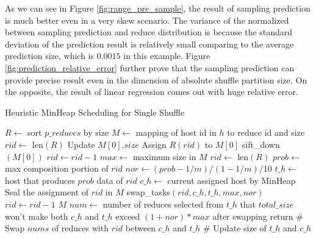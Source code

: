 As we can see in Figure \ref{fig:range_pre_sample}, the result of sampling prediction is much better even in a very skew scenario. The variance of the normalized between sampling prediction and reduce distribution is because the standard deviation of the prediction result is relatively small comparing to the average prediction size, which is $0.0015$ in this example. Figure \ref{fig:prediction_relative_error} further prove that the sampling prediction can provide precise result even in the dimension of absolute shuffle partition size. On the opposite, the result of linear regression comes out with huge relative error.
\begin{minipage}{\linewidth}
\begin{algorithm}[H]
\caption{Heuristic MinHeap Scheduling for Single Shuffle}
\label{hminheap}
	\begin{algorithmic}[1]
	\small
		\State $R\gets$ sort $p\_reduces$ by size
		\State $M\gets$ mapping of host id in $h$ to reduce id and size
		\State $rid\gets$ len$\left(R\right)$
		\State Update $M\left[0\right].size$
		\State Assign $R\left(rid\right)$ to $M\left[0\right]$
		\State sift\_down$\left(M\left[0\right]\right)$
		\State
		\State $rid\gets rid-1$
		\EndWhile
		\State $max\gets$ maximum size in $M$
		\State $rid\gets$ len$\left(R\right)$
		\State $prob\gets$ max composition portion of $rid$
		\State $nor\gets \left(prob-1/m\right)/\left(1-1/m\right)/10$
		\State
		\State $t\_h\gets$ host that produces $prob$ data of $rid$
		\State $c\_h\gets$ current assigned host by MinHeap
			\State Seal the assignment of $rid$ in $M$
		\Else
			\State swap\_tasks$\left(rid, c\_h, t\_h, max, nor\right)$
		\EndIf
		\State $rid\gets rid-1$
		\EndWhile
		\Return $M$
	\EndProcedure
	\State $num\gets$ number of reduces 
	\State selected from $t\_h$ that $total\_size$ won't
	\State make both $c\_h$ and $t\_h$ exceed $\left(1+nor\right)*max$
	\State after swapping
		\State return
	\Else
		\State \# Swap $nums$ of reduces with $rid$ between $c\_h$ and $t\_h$
		\State \# Update size of $t\_h$ and $c\_h$
	\EndIf
	\EndProcedure
	\end{algorithmic}
\end{algorithm}
\end{minipage}

